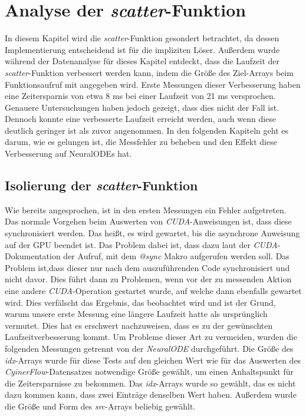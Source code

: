 
\section{Analyse der \textit{scatter}-Funktion} \label{sec:analyse_scatter}

In diesem Kapitel wird die \textit{scatter}-Funktion gesondert betrachtet, da
dessen Implementierung entscheidend ist für die impliziten Löser.
Außerdem wurde während der Datenanalyse für dieses Kapitel entdeckt,
dass die Laufzeit der \textit{scatter}-Funktion verbessert werden kann, 
indem die Größe des Ziel-Arrays beim Funktionsaufruf mit angegeben wird.
Erste Messungen dieser Verbesserung haben eine Zeitersparnis von etwa 8 ms bei einer Laufzeit von 21 ms 
versprochen.
Genauere Untersuchungen haben jedoch gezeigt, dass dies nicht der Fall ist.
Dennoch konnte eine verbesserte Laufzeit erreicht werden, auch wenn diese deutlich geringer ist als zuvor angenommen.
In den folgenden Kapiteln geht es darum, wie es gelungen ist, die Messfehler zu beheben und den Effekt diese Verbesserung auf NeuralODEs hat.


\subsection{Isolierung der \textit{scatter}-Funktion} \label{sec:isolation_of_the_scatter_funktion}

Wie bereits angesprochen, ist in den ersten Messungen ein Fehler aufgetreten.
Das normale Vorgehen beim Auswerten von \textit{CUDA}-Anweisungen ist, 
dass diese synchronisiert werden.
Das heißt, es wird gewartet, bis die asynchrone Anweisung auf der GPU beendet ist.
Das Problem dabei ist, dass dazu laut der \textit{CUDA}-Dokumentation der Aufruf, mit dem \textit{@sync} Makro aufgerufen werden soll.
Das Problem ist,dass dieser nur nach dem auszuführenden Code synchronisiert und nicht davor.
Dies führt dann zu Problemen, wenn vor der zu messenden Aktion eine andere \textit{CUDA}-Operation gestartet wurde, auf welche dann ebenfalls gewartet wird. 
Dies verfälscht das Ergebnis, das beobachtet wird und ist der Grund, warum unsere erste Messung eine längere Laufzeit hatte als ursprünglich vermutet.
Dies hat es erschwert nachzuweisen, dass es zu der gewünschten Laufzeitverbesserung kommt.
Um Probleme dieser Art zu vermeiden, wurden die folgenden Messungen getrennt von der \textit{NeuralODE} durchgeführt.
Die Größe des \textit{idx}-Arrays wurde für diese Tests auf den gleichen Wert wie für das Auswerten des \textit{CyinerFlow}-Datensatzes notwendige Größe gewählt, um einen Anhaltspunkt für die Zeitersparnisse zu bekommen.
Das \textit{idx}-Arrays wurde so gewählt, das es nicht dazu kommen kann, 
dass zwei Einträge denselben Wert haben. Außerdem wurde die Größe und Form des \textit{src}-Arrays beliebig gewählt.

